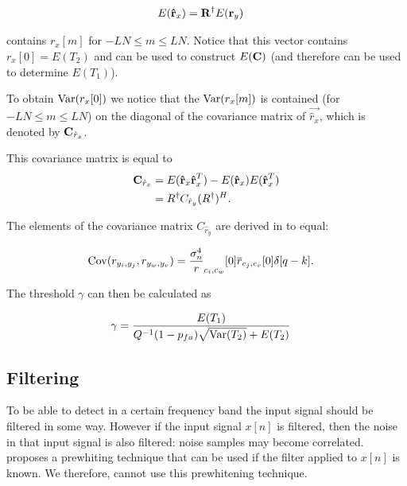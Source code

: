 \documentclass[a4paper, openany, oneside]{memoir}
\begin{document}
\begin{align*}
E(\boldsymbol{\mathbf{\hat{r}}}_x) &= \boldsymbol{\mathbf{R}}^{\dagger}E(\boldsymbol{\mathbf{r}}_y)
\end{align*}

contains $r_x[m]$ for $-LN \leq m \leq LN$. Notice that this vector contains $r_x[0] = E(T_2)$ and can be used to construct $E(\boldsymbol{\mathbf{C}})$ (and therefore can be used to determine $E(T_1)$).

To obtain $\operatorname{Var}(r_x[0])$ we notice that the $\operatorname{Var}(r_x[m])$ is contained (for $-LN \leq m \leq LN$) on the diagonal of the covariance matrix of $\vec{\hat{r}_x}$, which is denoted by $\boldsymbol{\mathbf{C}}_{\hat{r}_x}$.

This covariance matrix is equal to
\begin{align*}
\boldsymbol{\mathbf{C}}_{\hat{r}_x} &= E(\boldsymbol{\mathbf{\hat{r}}}_x\boldsymbol{\mathbf{\hat{r}}}_x^T) - E(\boldsymbol{\mathbf{\hat{r}}}_x) E(\boldsymbol{\mathbf{\hat{r}}}_x^T)\\
&= R^{\dagger}C_{\hat{r}_y}(R^{\dagger})^H.
\end{align*}

The elements of the covariance matrix $C_{\hat{r}_y}$ are derived in \cite{ariananda2012compressive} to equal:

\begin{align}
\operatorname{Cov}(r_{{y_i},y_j}, r_{{y_w},y_v}) &= \frac{\sigma_n^4} r_{c_i,c_w}[0]\overline{r}_{c_j,c_v}[0]\delta[q-k].
\end{align}

The threshold $\gamma$ can then be calculated as

\begin{align*}
\gamma &= \frac{E(T_1)}{Q^{-1}(1-p_{fa})\sqrt{\operatorname{Var}(T_2)}+E(T_2)}
\end{align*}

\subsection{Filtering}
To be able to detect in a certain frequency band the input signal should be filtered in some way. However if the input signal $x[n]$ is filtered, then the noise in that input signal is also filtered: noise samples may become correlated. \cite{zheng2009spectrum} proposes a prewhiting technique
that can be used if the filter applied to $x[n]$ is known. We therefore, cannot use this prewhitening technique. 


\end{document}
